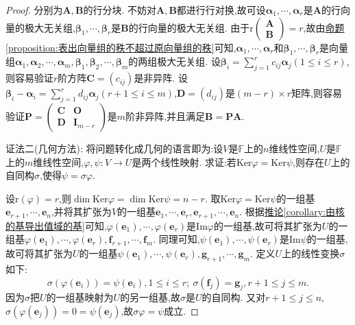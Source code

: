 \documentclass[lang=cn,newtx,10pt,scheme=chinese]{elegantbook}
\begin{document}
\begin{proof}
分别为\(\boldsymbol{A},\boldsymbol{B}\)的行分块. 不妨对\(\boldsymbol{A},\boldsymbol{B}\)都进行行对换,故可设\(\boldsymbol{\alpha}_1,\cdots,\boldsymbol{\alpha}_r\)是\(\boldsymbol{A}\)的行向量的极大无关组,\(\boldsymbol{\beta}_1,\cdots,\boldsymbol{\beta}_r\)是\(\boldsymbol{B}\)的行向量的极大无关组. 由于\(\text{r}\begin{pmatrix}\boldsymbol{A}\\\boldsymbol{B}\end{pmatrix}=r\),故由\hyperref[proposition:表出向量组的秩不超过原向量组的秩]{命题\ref{proposition:表出向量组的秩不超过原向量组的秩}}可知,\(\boldsymbol{\alpha}_1,\cdots,\boldsymbol{\alpha}_r\)和\(\boldsymbol{\beta}_1,\cdots,\boldsymbol{\beta}_r\)是向量组\(\boldsymbol{\alpha}_1,\boldsymbol{\alpha}_2,\cdots,\boldsymbol{\alpha}_m,\)\(\boldsymbol{\beta}_1,\boldsymbol{\beta}_2,\cdots,\boldsymbol{\beta}_m\)的两组极大无关组. 设\(\boldsymbol{\beta}_i=\sum_{j = 1}^{r}c_{ij}\boldsymbol{\alpha}_j(1\leq i\leq r)\),则容易验证\(r\)阶方阵\(\boldsymbol{C}=(c_{ij})\)是非异阵. 设\(\boldsymbol{\beta}_i-\boldsymbol{\alpha}_i=\sum_{j = 1}^{r}d_{ij}\boldsymbol{\alpha}_j(r + 1\leq i\leq m)\),\(\boldsymbol{D}=(d_{ij})\)是\((m - r)\times r\)矩阵,则容易验证\(\boldsymbol{P}=\begin{pmatrix}\boldsymbol{C}&\boldsymbol{O}\\\boldsymbol{D}&\boldsymbol{I}_{m - r}\end{pmatrix}\)是\(m\)阶非异阵,并且满足\(\boldsymbol{B}=\boldsymbol{P}\boldsymbol{A}\).

{\color{blue}证法二(几何方法):}  将问题转化成几何的语言即为:设\(V\)是\(\mathbb{F}\)上的\(n\)维线性空间,\(U\)是\(\mathbb{F}\)上的\(m\)维线性空间,\(\varphi,\psi:V\to U\)是两个线性映射. 求证:若\(\text{Ker}\varphi=\text{Ker}\psi\),则存在\(U\)上的自同构\(\sigma\),使得\(\psi=\sigma\varphi\).

设\(\text{r}(\varphi)=r\),则\(\dim\text{Ker}\varphi=\dim\text{Ker}\psi=n - r\). 取\(\text{Ker}\varphi=\text{Ker}\psi\)的一组基\(\boldsymbol{e}_{r + 1},\cdots,\boldsymbol{e}_n\),并将其扩张为\(V\)的一组基\(\boldsymbol{e}_1,\cdots,\boldsymbol{e}_r,\boldsymbol{e}_{r + 1},\cdots,\boldsymbol{e}_n\). 根据\hyperref[corollary:由核的基导出值域的基]{推论\ref{corollary:由核的基导出值域的基}}可知,\(\varphi(\boldsymbol{e}_1),\cdots,\varphi(\boldsymbol{e}_r)\)是\(\text{Im}\varphi\)的一组基,故可将其扩张为\(U\)的一组基\(\varphi(\boldsymbol{e}_1),\cdots,\varphi(\boldsymbol{e}_r),\boldsymbol{f}_{r + 1},\cdots,\boldsymbol{f}_m\). 同理可知,\(\psi(\boldsymbol{e}_1),\cdots,\psi(\boldsymbol{e}_r)\)是\(\text{Im}\psi\)的一组基,故可将其扩张为\(U\)的一组基\(\psi(\boldsymbol{e}_1),\cdots,\psi(\boldsymbol{e}_r),\boldsymbol{g}_{r + 1},\cdots,\boldsymbol{g}_m\). 定义\(U\)上的线性变换\(\sigma\)如下:
\[
\sigma(\varphi(\boldsymbol{e}_i))=\psi(\boldsymbol{e}_i),1\leq i\leq r;\ \sigma(\boldsymbol{f}_j)=\boldsymbol{g}_j,r + 1\leq j\leq m.
\]
因为\(\sigma\)把\(U\)的一组基映射为\(U\)的另一组基,故\(\sigma\)是\(U\)的自同构. 又对\(r + 1\leq j\leq n\),\(\sigma(\varphi(\boldsymbol{e}_j))=0=\psi(\boldsymbol{e}_j)\),故\(\sigma\varphi=\psi\)成立. 
\end{proof}
\end{document}
